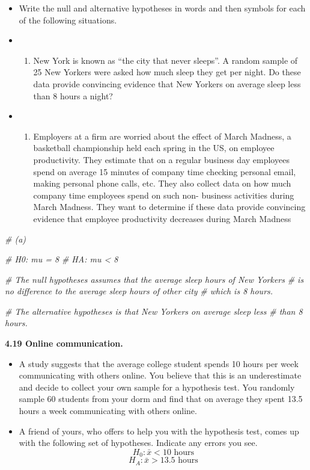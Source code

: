 \documentclass[]{book}
\newenvironment{Shaded}{\begin{snugshade}}{\end{snugshade}}
\newcommand{\CommentTok}[1]{\textcolor[rgb]{0.56,0.35,0.01}{\textit{#1}}}
\providecommand{\tightlist}{%
  \setlength{\itemsep}{0pt}\setlength{\parskip}{0pt}}
\begin{document}
\begin{itemize}
\item
  Write the null and alternative hypotheses in words and
  then symbols for each of the following situations.
\item
  \begin{enumerate}
  \def\labelenumi{(\alph{enumi})}
  \tightlist
  \item
    New York is known as ``the city that never sleeps''. A random sample of 25 New Yorkers were
    asked how much sleep they get per night. Do these data provide convincing evidence that
    New Yorkers on average sleep less than 8 hours a night?
  \end{enumerate}
\item
  \begin{enumerate}
  \def\labelenumi{(\alph{enumi})}
  \setcounter{enumi}{1}
  \tightlist
  \item
    Employers at a firm are worried about the effect of March Madness, a basketball championship
    held each spring in the US, on employee productivity. They estimate that on a regular business
    day employees spend on average 15 minutes of company time checking personal email, making
    personal phone calls, etc. They also collect data on how much company time employees spend
    on such non- business activities during March Madness. They want to determine if these data
    provide convincing evidence that employee productivity decreases during March Madness
  \end{enumerate}
\end{itemize}

\begin{Shaded}
\begin{Highlighting}[]
\CommentTok{# (a)}

\CommentTok{# H0: mu = 8}
\CommentTok{# HA: mu < 8}

\CommentTok{# The null hypotheses assumes that the average sleep hours of New Yorkers }
\CommentTok{# is no difference to the average sleep hours of other city }
\CommentTok{# which is 8 hours.}

\CommentTok{# The alternative hypotheses is that New Yorkers on average sleep less }
\CommentTok{# than 8 hours.}
\end{Highlighting}
\end{Shaded}

\textbf{4.19 Online communication.}

\begin{itemize}
\tightlist
\item
  A study suggests that the average college student spends 10
  hours per week communicating with others online. You believe that this is an underestimate and
  decide to collect your own sample for a hypothesis test. You randomly sample 60 students from
  your dorm and find that on average they spent 13.5 hours a week communicating with others
  online.
\item
  A friend of yours, who offers to help you with the hypothesis test, comes up with the
  following set of hypotheses. Indicate any errors you see.
  \[H_0 : \bar{x} < 10 \text{ hours}\]
  \[H_A : \bar{x} > 13.5 \text{ hours}\]
\end{itemize}
\end{document}
